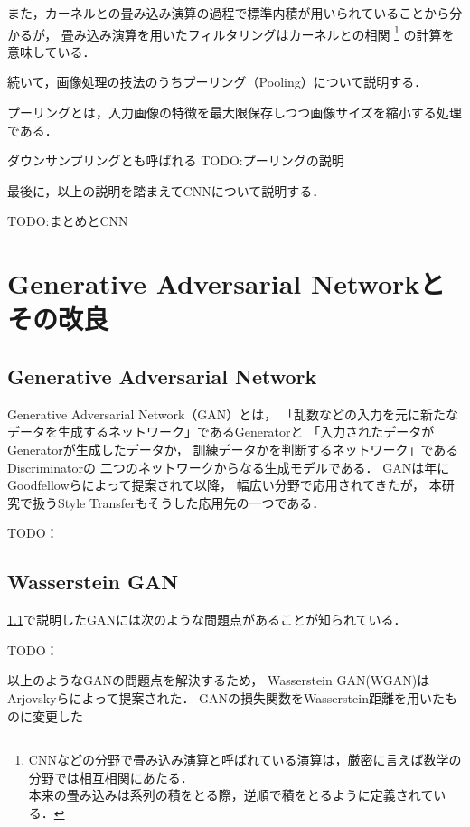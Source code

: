 \documentclass[\homedir/main.tex]{subfiles}
\begin{document}
また，カーネルとの畳み込み演算の過程で標準内積が用いられていることから分かるが，
畳み込み演算を用いたフィルタリングはカーネルとの相関
\footnote{
    CNNなどの分野で畳み込み演算と呼ばれている演算は，厳密に言えば数学の分野では相互相関にあたる．\\
    本来の畳み込みは系列の積をとる際，逆順で積をとるように定義されている．
}
の計算を意味している．

続いて，画像処理の技法のうちプーリング（Pooling）について説明する．

プーリングとは，入力画像の特徴を最大限保存しつつ画像サイズを縮小する処理である．

ダウンサンプリングとも呼ばれる
TODO:プーリングの説明

最後に，以上の説明を踏まえてCNNについて説明する．

TODO:まとめとCNN

\section{Generative Adversarial Networkとその改良}\label{sec:gan_and_its_improvements}
\subsection{Generative Adversarial Network}\label{sec:gan}
Generative Adversarial Network（GAN）とは，
「乱数などの入力を元に新たなデータを生成するネットワーク」であるGeneratorと
「入力されたデータがGeneratorが生成したデータか，
訓練データかを判断するネットワーク」であるDiscriminatorの
二つのネットワークからなる生成モデルである．
GANは\citeyear{NIPS2014_5ca3e9b1}年に
Goodfellowら\cite{NIPS2014_5ca3e9b1}によって提案されて以降，
幅広い分野で応用されてきたが，
本研究で扱うStyle Transferもそうした応用先の一つである．


TODO：



\subsection{Wasserstein GAN}\label{sec:wgan}
\cref{sec:gan}で説明したGANには次のような問題点があることが知られている．

TODO：

以上のようなGANの問題点を解決するため，
Wasserstein GAN(WGAN)は
Arjovskyら\cite{pmlr-v70-arjovsky17a}によって提案された．
GANの損失関数をWasserstein距離を用いたものに変更した
\end{document}

